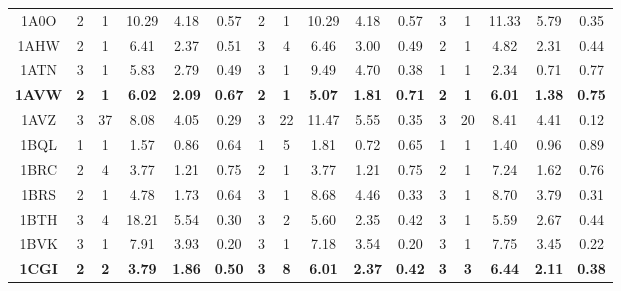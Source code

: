 \begin{longtable}{c c c c c c|c c c c c|c c c c c}
 {\tiny 1A0O}&{\tiny 2}&{\tiny 1}&{\tiny 10.29}&{\tiny 4.18}&{\tiny 0.57}&{\tiny 2}&{\tiny 1}&{\tiny 10.29}&{\tiny 4.18}&{\tiny 0.57}&{\tiny 3}&{\tiny 1}&{\tiny 11.33}&{\tiny 5.79}&{\tiny 0.35}\\ 
 {\tiny 1AHW}&{\tiny 2}&{\tiny 1}&{\tiny 6.41}&{\tiny 2.37}&{\tiny 0.51}&{\tiny 3}&{\tiny 4}&{\tiny 6.46}&{\tiny 3.00}&{\tiny 0.49}&{\tiny 2}&{\tiny 1}&{\tiny 4.82}&{\tiny 2.31}&{\tiny 0.44}\\ 
 {\tiny 1ATN}&{\tiny 3}&{\tiny 1}&{\tiny 5.83}&{\tiny 2.79}&{\tiny 0.49}&{\tiny 3}&{\tiny 1}&{\tiny 9.49}&{\tiny 4.70}&{\tiny 0.38}&{\tiny 1}&{\tiny 1}&{\tiny 2.34}&{\tiny 0.71}&{\tiny 0.77}\\ 
 \textbf{\tiny 1AVW}&\textbf{\tiny 2}&\textbf{\tiny 1}&\textbf{\tiny 6.02}&\textbf{\tiny 2.09}&\textbf{\tiny 0.67}&\textbf{\tiny 2}&\textbf{\tiny 1}&\textbf{\tiny 5.07}&\textbf{\tiny 1.81}&\textbf{\tiny 0.71}&\textbf{\tiny 2}&\textbf{\tiny 1}&\textbf{\tiny 6.01}&\textbf{\tiny 1.38}&\textbf{\tiny 0.75}\\ 
 {\tiny 1AVZ}&{\tiny 3}&{\tiny 37}&{\tiny 8.08}&{\tiny 4.05}&{\tiny 0.29}&{\tiny 3}&{\tiny 22}&{\tiny 11.47}&{\tiny 5.55}&{\tiny 0.35}&{\tiny 3}&{\tiny 20}&{\tiny 8.41}&{\tiny 4.41}&{\tiny 0.12}\\ 
 {\tiny 1BQL}&{\tiny 1}&{\tiny 1}&{\tiny 1.57}&{\tiny 0.86}&{\tiny 0.64}&{\tiny 1}&{\tiny 5}&{\tiny 1.81}&{\tiny 0.72}&{\tiny 0.65}&{\tiny 1}&{\tiny 1}&{\tiny 1.40}&{\tiny 0.96}&{\tiny 0.89}\\ 
 {\tiny 1BRC}&{\tiny 2}&{\tiny 4}&{\tiny 3.77}&{\tiny 1.21}&{\tiny 0.75}&{\tiny 2}&{\tiny 1}&{\tiny 3.77}&{\tiny 1.21}&{\tiny 0.75}&{\tiny 2}&{\tiny 1}&{\tiny 7.24}&{\tiny 1.62}&{\tiny 0.76}\\ 
 {\tiny 1BRS}&{\tiny 2}&{\tiny 1}&{\tiny 4.78}&{\tiny 1.73}&{\tiny 0.64}&{\tiny 3}&{\tiny 1}&{\tiny 8.68}&{\tiny 4.46}&{\tiny 0.33}&{\tiny 3}&{\tiny 1}&{\tiny 8.70}&{\tiny 3.79}&{\tiny 0.31}\\ 
 {\tiny 1BTH}&{\tiny 3}&{\tiny 4}&{\tiny 18.21}&{\tiny 5.54}&{\tiny 0.30}&{\tiny 3}&{\tiny 2}&{\tiny 5.60}&{\tiny 2.35}&{\tiny 0.42}&{\tiny 3}&{\tiny 1}&{\tiny 5.59}&{\tiny 2.67}&{\tiny 0.44}\\ 
 {\tiny 1BVK}&{\tiny 3}&{\tiny 1}&{\tiny 7.91}&{\tiny 3.93}&{\tiny 0.20}&{\tiny 3}&{\tiny 1}&{\tiny 7.18}&{\tiny 3.54}&{\tiny 0.20}&{\tiny 3}&{\tiny 1}&{\tiny 7.75}&{\tiny 3.45}&{\tiny 0.22}\\ 
 \textbf{\tiny 1CGI}&\textbf{\tiny 2}&\textbf{\tiny 2}&\textbf{\tiny 3.79}&\textbf{\tiny 1.86}&\textbf{\tiny 0.50}&\textbf{\tiny 3}&\textbf{\tiny 8}&\textbf{\tiny 6.01}&\textbf{\tiny 2.37}&\textbf{\tiny 0.42}&\textbf{\tiny 3}&\textbf{\tiny 3}&\textbf{\tiny 6.44}&\textbf{\tiny 2.11}&\textbf{\tiny 0.38}\\ 

\end{longtable}
